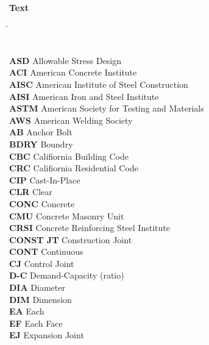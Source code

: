 \begin{center}\textbf{Text}\end{center}
\setlength{\parindent}{0.2in}
\hspace*{4cm} \= \kill
\begin{tabbing}
    \indent\textbf{}         \>  {}\\
    \indent\textbf{ASD}      \>  {Allowable Stress Design}\\
    \indent\textbf{ACI}      \>  {American Concrete Institute}\\
    \indent\textbf{AISC}     \>  {American Institute of Steel Construction}\\
    \indent\textbf{AISI}     \>  {American Iron and Steel Institute}\\
    \indent\textbf{ASTM}     \>  {American Society for Testing and Materials}\\
    \indent\textbf{AWS}      \>  {American Welding Society}\\
    \indent\textbf{AB}       \>  {Anchor Bolt}\\
    \indent\textbf{BDRY}     \>  {Boundry}\\
    \indent\textbf{CBC}      \>  {Califiornia Building Code}\\
    \indent\textbf{CRC}      \>  {Califiornia Residential Code}\\
    \indent\textbf{CIP}      \>  {Cast-In-Place}\\
    \indent\textbf{CLR}      \>  {Clear}\\
    \indent\textbf{CONC}     \>  {Concrete}\\
    \indent\textbf{CMU}      \>  {Concrete Masonry Unit}\\
    \indent\textbf{CRSI}     \>  {Concrete Reinforcing Steel Institute}\\
    \indent\textbf{CONST JT} \>  {Construction Joint}\\
    \indent\textbf{CONT}     \>  {Continuous}\\
    \indent\textbf{CJ}       \>  {Control Joint}\\
    \indent\textbf{D-C}      \>  {Demand-Capacity (ratio)}\\
    \indent\textbf{DIA}      \>  {Diameter}\\
    \indent\textbf{DIM}      \>  {Dimension}\\
    \indent\textbf{EA}       \>  {Each}\\
    \indent\textbf{EF}       \>  {Each Face}\\
    \indent\textbf{EJ}       \>  {Expansion Joint}\\

\end{tabbing}

